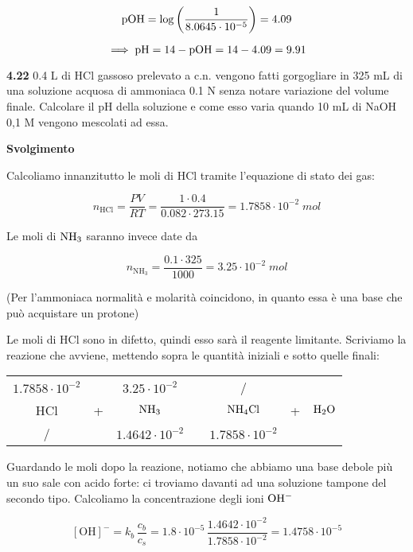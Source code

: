 $$\rm pOH=\log \left( \frac{1}{8.0645 \cdot 10^{-5}} \right)=4.09$$

$$\implies \rm pH=14-pOH=14-4.09=9.91$$

\vspace{0.2cm}\textbf{4.22} 0.4 L di HCl gassoso prelevato a c.n. vengono fatti gorgogliare in 325 mL di una soluzione acquosa di ammoniaca 0.1 N senza notare variazione del volume finale. Calcolare il pH della soluzione e come esso varia quando 10 mL di NaOH 0,1 M vengono mescolati ad essa.

\vspace{0.2cm}\large\textbf{Svolgimento}\normalsize

\vspace{0.2cm} Calcoliamo innanzitutto le moli di HCl tramite l'equazione di stato dei gas:

$$n_{\text{HCl}}=\frac{PV}{RT}=\frac{1 \cdot 0.4}{0.082 \cdot 273.15}=1.7858 \cdot 10^{-2}\;mol$$

Le moli di $\rm NH_3$ saranno invece date da

$$n_{\text{NH}_3}=\frac{0.1 \cdot 325}{1000}=3.25 \cdot 10^{-2}\;mol$$

(Per l'ammoniaca normalità e molarità coincidono, in quanto essa è una base che può acquistare un protone)

Le moli di HCl sono in difetto, quindi esso sarà il reagente limitante. Scriviamo la reazione che avviene, mettendo sopra le quantità iniziali e sotto quelle finali:

\begin{center}
    \begin{tabular}{ccccccc}
        $1.7858 \cdot 10^{-2}$ &  & $3.25 \cdot 10^{-2}$ & & / & &\\
        HCl & + & $\rm NH_3$ & \ce{->} & $\rm NH_4Cl$ & + & $\rm H_2O$\\
        / &  &  $1.4642 \cdot 10^{-2}$ & & $1.7858 \cdot 10^{-2}$ & &\\
    \end{tabular}
\end{center}

Guardando le moli dopo la reazione, notiamo che abbiamo una base debole più un suo sale con acido forte: ci troviamo davanti ad una soluzione tampone del secondo tipo. Calcoliamo la concentrazione degli ioni $\rm OH^-$

$$[\text{OH}]^-=k_b\,\frac{c_b}{c_s}
=1.8 \cdot 10^{-5}\,\frac{1.4642 \cdot 10^{-2}}{1.7858 \cdot 10^{-2}}
=1.4758 \cdot 10^{-5}$$


